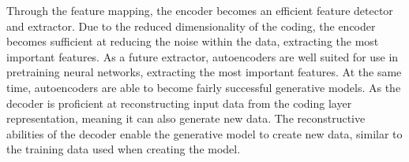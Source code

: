 Through the feature mapping, the encoder becomes an efficient feature detector and extractor.
Due to the reduced dimensionality of the coding, the encoder becomes sufficient at reducing the noise within the data, extracting the most important features.
As a future extractor, autoencoders are well suited for use in pretraining neural networks, extracting the most important features.
At the same time, autoencoders are able to become fairly successful generative models.
As the decoder is proficient at reconstructing input data from the coding layer representation, meaning it can also generate new data.
The reconstructive abilities of the decoder enable the generative model to create new data, similar to the training data used when creating the model.
\cite[p.~506-508]{Geron2017}
